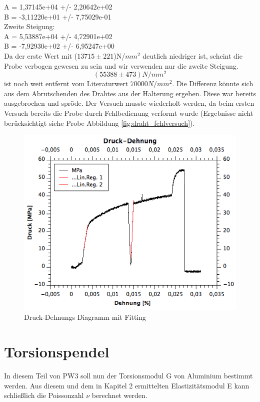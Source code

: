 \documentclass[12pt,a4paper]{article}
\begin{document}
\begin{multicols}{2}
A = 1,37145e+04 +/- 2,20642e+02\\
B = -3,11220e+01 +/- 7,75029e-01\\
Zweite Steigung:\\
A = 5,53887e+04 +/- 4,72901e+02\\
B = -7,92930e+02 +/- 6,95247e+00\\
Da der erste Wert mit ($13715 \pm 221$)N/$mm^2$ deutlich niedriger ist, scheint die Probe verbogen gewesen zu sein und wir verwenden nur die zweite Steigung. $$(55388 \pm 473)N/mm^2$$ ist noch weit entfernt vom Literaturwert $70000 N/mm^2$. Die Differenz könnte sich aus dem Abrutschenden des Drahtes aus der Halterung ergeben. Diese war bereits ausgebrochen und spröde. Der Versuch musste wiederholt werden, da beim ersten Versuch bereits die Probe durch Fehlbedienung verformt wurde (Ergebnisse nicht berücksichtigt siehe Probe Abbildung \ref{fig:draht_fehlversuch}).\\

\begin{figure}[H]
	\centering
  	\includegraphics[scale=0.4]{./figure/druck_dehnung_linreg.png}
	\caption{Druck-Dehnungs Diagramm mit Fitting}
	\label{fig:draht_druck_dehnung_linreg}
\end{figure}

\section{Torsionspendel}
In diesem Teil von PW3 soll nun der Torsionsmodul G von Aluminium bestimmt werden. Aus diesem und dem in Kapitel 2 ermittelten Elastizitätsmodul E kann schließlich die Poissonzahl $\nu $ berechnet werden.\\


\end{multicols}
\end{document}
